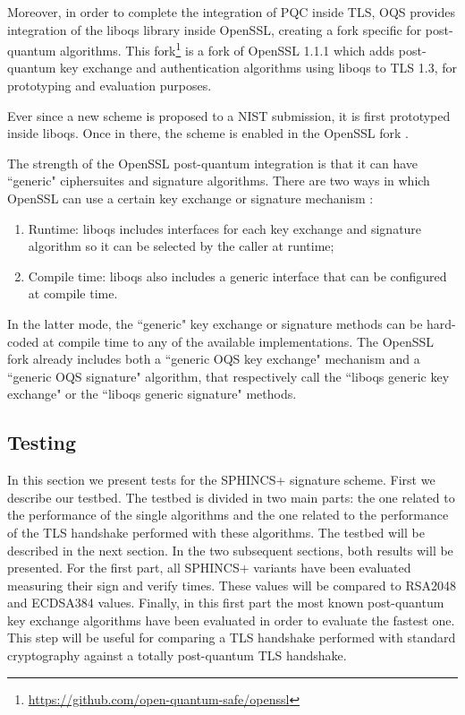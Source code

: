 \documentclass[a4paper,12pt]{article}
\begin{document}
Moreover, in order to complete the integration of PQC inside TLS, OQS provides integration of the liboqs library inside OpenSSL, creating a fork specific for post-quantum algorithms. This fork\footnote{\url{https://github.com/open-quantum-safe/openssl}} is a fork of OpenSSL 1.1.1 which adds post-quantum key exchange and authentication algorithms using liboqs to TLS 1.3, for prototyping and evaluation purposes.

Ever since a new scheme is proposed to a NIST submission, it is first prototyped inside liboqs. Once in there, the scheme is enabled in the OpenSSL fork \cite{16_Quantum}.

The strength of the OpenSSL post-quantum integration is that it can have ``generic" ciphersuites and signature algorithms.
There are two ways in which OpenSSL can use a certain key exchange or signature mechanism \cite{10_postquantum_keyexchange}:
\begin{enumerate}
    \item Runtime: liboqs includes interfaces for each key exchange and signature algorithm so it can be selected by the caller at runtime;
    \item Compile time: liboqs also includes a generic interface that can be configured at compile time.
\end{enumerate}

In the latter mode, the ``generic" key exchange or signature methods can be hard-coded at compile time to any of the available implementations. The OpenSSL fork already includes both a ``generic OQS key exchange" mechanism and a ``generic OQS signature" algorithm, that respectively call the ``liboqs generic key exchange" or the ``liboqs generic signature" methods.


\subsection{Testing}
\label{sub:testing}

In this section we present tests for the SPHINCS+ signature scheme. First we describe our testbed. The testbed is divided in two main parts: the one related to the performance of the single algorithms and the one related to the performance of the TLS handshake performed with these algorithms. The testbed will be described in the next section.
In the two subsequent sections, both results will be presented.
For the first part, all SPHINCS+ variants have been evaluated measuring their sign and verify times. 
These values will be compared to RSA2048 and ECDSA384 values.
Finally, in this first part the most known post-quantum key exchange algorithms have been evaluated in order to evaluate the fastest one. This step will be useful for comparing a TLS handshake performed with standard cryptography against a totally post-quantum TLS handshake.
\end{document}
